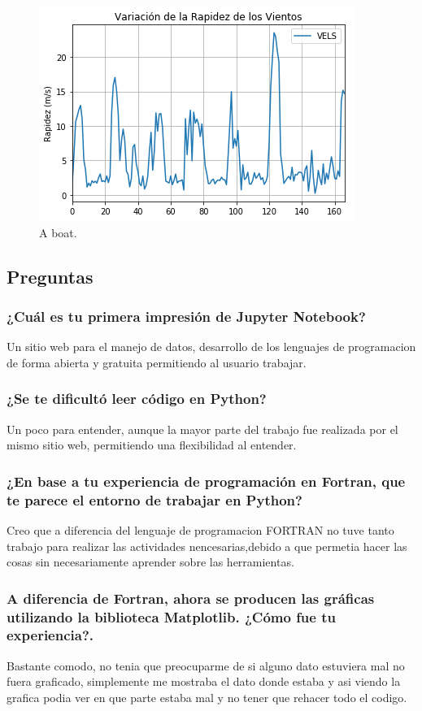 \documentclass{article}
\begin{document}
\begin{figure}
  \includegraphics[width=\linewidth]{vels.png}
  \caption{A boat.}
  \label{fig:boat1}
\end{figure}

\subsection{Preguntas}
\subsubsection{¿Cuál es tu primera impresión de Jupyter Notebook?}
Un sitio web para el manejo de datos, desarrollo de los lenguajes de programacion de forma abierta y gratuita permitiendo al usuario trabajar.
\subsubsection{¿Se te dificultó leer código en Python?}
Un poco para entender, aunque la mayor parte del trabajo fue realizada por el mismo sitio web, permitiendo una flexibilidad al entender.
\subsubsection{¿En base a tu experiencia de programación en Fortran, que te parece el entorno de trabajar en Python?}
Creo que a diferencia del lenguaje de programacion FORTRAN no tuve tanto trabajo para realizar las actividades nencesarias,debido a que permetia hacer las cosas sin necesariamente aprender sobre las herramientas.
\subsubsection{A diferencia de Fortran, ahora se producen las gráficas utilizando la biblioteca Matplotlib. ¿Cómo fue tu experiencia?.}
Bastante comodo, no tenia que preocuparme de si alguno dato estuviera mal no fuera graficado, simplemente me mostraba el dato donde estaba y asi viendo la grafica podia ver en que parte estaba mal y no tener que rehacer todo el codigo.
\end{document}
